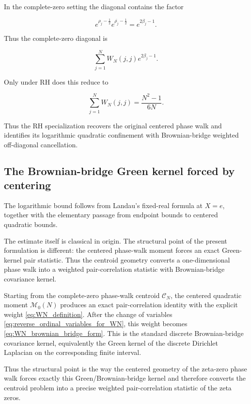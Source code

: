 \documentclass[11pt]{amsart}
\numberwithin{equation}{section}
\theoremstyle{plain}
\theoremstyle{definition}
\theoremstyle{remark}
\begin{document}
In the complete-zero setting the diagonal contains the factor

\begin{equation}
e^{\rho_j-\frac12}e^{\overline{\rho_j}-\frac12}
=
e^{2\beta_j-1}.
\end{equation}

Thus the complete-zero diagonal is

\begin{equation}
\sum_{j=1}^{N}W_N(j,j)e^{2\beta_j-1}.
\label{eq:complete_zero_diagonal_contribution}
\end{equation}

Only under RH does this reduce to

\begin{equation}
\sum_{j=1}^{N}W_N(j,j)
=
\frac{N^2-1}{6N}.
\end{equation}

Thus the RH specialization recovers the original centered phase walk and
identifies its logarithmic quadratic confinement with Brownian-bridge
weighted off-diagonal cancellation.

\subsection{The Brownian-bridge Green kernel forced by centering}
\label{subsec:what_is_new_present_formulation}

The logarithmic bound follows from Landau's fixed-real formula at \(X=e\),
together with the elementary passage from endpoint bounds to
centered quadratic bounds.

The estimate itself is classical in origin. The structural point of the
present formulation is different: the centered phase-walk moment forces
an exact Green-kernel pair statistic. Thus the centroid geometry
converts a one-dimensional phase walk into a weighted pair-correlation
statistic with Brownian-bridge covariance kernel.

Starting from the complete-zero phase-walk centroid \(\mathcal C_N\),
the centered quadratic moment \(\mathcal M_0(N)\) produces an exact
pair-correlation identity with the explicit weight
\eqref{eq:WN_definition}. After the change of variables
\eqref{eq:reverse_ordinal_variables_for_WN}, this weight becomes
\eqref{eq:WN_brownian_bridge_form}. This is the standard discrete
Brownian-bridge covariance kernel, equivalently the Green kernel of the
discrete Dirichlet Laplacian on the corresponding finite interval.

Thus the structural point is the way the centered geometry of the
zeta-zero phase walk forces exactly this Green/Brownian-bridge kernel and
therefore converts the centroid problem into a precise weighted
pair-correlation statistic of the zeta zeros.
\end{document}
